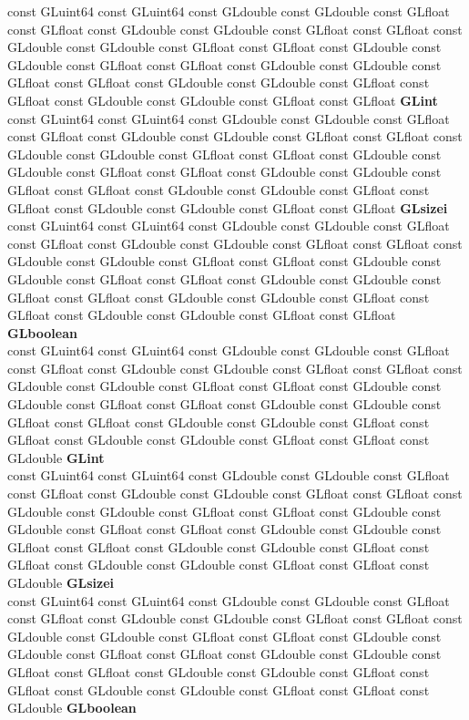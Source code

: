 \begin{DoxyCompactItemize}
\begin{tabbing}
\>const GLuint64 const GLuint64 const GLdouble const GLdouble const GLfloat const GLfloat const GLdouble const GLdouble const GLfloat const GLfloat const GLdouble const GLdouble const GLfloat const GLfloat const GLdouble const GLdouble const GLfloat const GLfloat const GLdouble const GLdouble const GLfloat const GLfloat const GLdouble const GLdouble const GLfloat const GLfloat const GLdouble const GLdouble const GLfloat const GLfloat {\bfseries GLint}\\
\>const GLuint64 const GLuint64 const GLdouble const GLdouble const GLfloat const GLfloat const GLdouble const GLdouble const GLfloat const GLfloat const GLdouble const GLdouble const GLfloat const GLfloat const GLdouble const GLdouble const GLfloat const GLfloat const GLdouble const GLdouble const GLfloat const GLfloat const GLdouble const GLdouble const GLfloat const GLfloat const GLdouble const GLdouble const GLfloat const GLfloat {\bfseries GLsizei}\\
\>const GLuint64 const GLuint64 const GLdouble const GLdouble const GLfloat const GLfloat const GLdouble const GLdouble const GLfloat const GLfloat const GLdouble const GLdouble const GLfloat const GLfloat const GLdouble const GLdouble const GLfloat const GLfloat const GLdouble const GLdouble const GLfloat const GLfloat const GLdouble const GLdouble const GLfloat const GLfloat const GLdouble const GLdouble const GLfloat const GLfloat {\bfseries GLboolean}\\
\>const GLuint64 const GLuint64 const GLdouble const GLdouble const GLfloat const GLfloat const GLdouble const GLdouble const GLfloat const GLfloat const GLdouble const GLdouble const GLfloat const GLfloat const GLdouble const GLdouble const GLfloat const GLfloat const GLdouble const GLdouble const GLfloat const GLfloat const GLdouble const GLdouble const GLfloat const GLfloat const GLdouble const GLdouble const GLfloat const GLfloat const GLdouble {\bfseries GLint}\\
\>const GLuint64 const GLuint64 const GLdouble const GLdouble const GLfloat const GLfloat const GLdouble const GLdouble const GLfloat const GLfloat const GLdouble const GLdouble const GLfloat const GLfloat const GLdouble const GLdouble const GLfloat const GLfloat const GLdouble const GLdouble const GLfloat const GLfloat const GLdouble const GLdouble const GLfloat const GLfloat const GLdouble const GLdouble const GLfloat const GLfloat const GLdouble {\bfseries GLsizei}\\
\>const GLuint64 const GLuint64 const GLdouble const GLdouble const GLfloat const GLfloat const GLdouble const GLdouble const GLfloat const GLfloat const GLdouble const GLdouble const GLfloat const GLfloat const GLdouble const GLdouble const GLfloat const GLfloat const GLdouble const GLdouble const GLfloat const GLfloat const GLdouble const GLdouble const GLfloat const GLfloat const GLdouble const GLdouble const GLfloat const GLfloat const GLdouble {\bfseries GLboolean}\\

\end{tabbing}
\end{DoxyCompactItemize}
